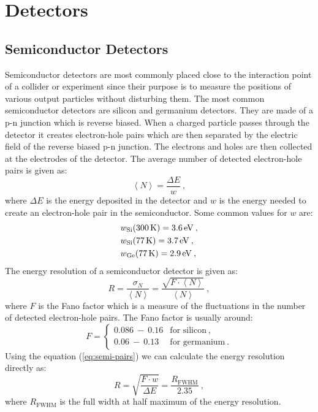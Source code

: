 \documentclass[10pt, titlepage, a4paper]{article}
\numberwithin{equation}{section}
\begin{document}
\section{Detectors}
\subsection{Semiconductor Detectors}
Semiconductor detectors are most commonly placed close to the interaction point of a collider or experiment since their 
purpose is to measure the positions of various output particles without disturbing them. The most common semiconductor
detectors are silicon and germanium detectors. They are made of a p-n junction which is reverse biased. When a charged particle
passes through the detector it creates electron-hole pairs which are then separated by the electric field of the
reverse biased p-n junction. The electrons and holes are then collected at the electrodes of the detector. The average number 
of detected electron-hole pairs is given as:
%
\begin{equation}
    \left\langle N \right\rangle = \frac{\Delta E}{w}\>,
    \label{eq:semi-pairs}
\end{equation}
%
where $\Delta E$ is the energy deposited in the detector and $w$ is the energy needed to create an electron-hole pair in the 
semiconductor. Some common values for $w$ are:
%
\begin{align*}
    & w_{\text{Si}}(300\,\rm{K}) = 3.6\,\rm{eV}\>, \\
    & w_{\text{Si}}(77\,\rm{K}) = 3.7\,\rm{eV}\>, \\
    & w_{\text{Ge}}(77\,\rm{K}) = 2.9\,\rm{eV}\>, \\
\end{align*}
%
The energy resolution of a semiconductor detector is given as:
%
\begin{equation}
    R = \frac{\sigma_N}{\left\langle N \right\rangle} = \frac{\sqrt{F\cdot\left\langle N \right\rangle}}{\left\langle N \right\rangle}\>,
    \label{eq:semi-res-full}
\end{equation}
%
where $F$ is the Fano factor which is a measure of the fluctuations in the number of detected electron-hole pairs. The Fano factor
is usually around:
%
\begin{equation}
    F = \begin{cases}
        0.086\>-\>0.16 & \text{for silicon}\>, \\
        0.06\>-\>0.13 & \text{for germanium}\>.
    \end{cases}
\end{equation}
%
Using the equation (\ref{eq:semi-pairs}) we can calculate the energy resolution directly as:
%
\begin{equation}
    R = \sqrt{\frac{F\cdot w}{\Delta E}} = \frac{R_\text{FWHM}}{2.35}\>,
    \label{eq:semi-res}
\end{equation}
%
where $R_\text{FWHM}$ is the full width at half maximum of the energy resolution.
\end{document}
